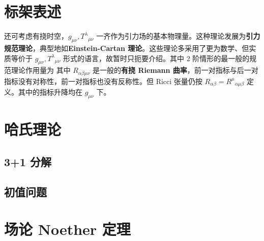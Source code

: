 \section{标架表述}

还可考虑有挠时空，$g_{\mu\nu},T^\lambda{}_{\mu\nu}$ 一齐作为引力场的基本物理量。这种理论发展为\textbf{引力规范理论}，典型地如\textbf{Einstein-Cartan 理论}。这些理论多采用了更为数学、但实质等价于 $g_{\mu\nu},T^\lambda{}_{\mu\nu}$ 形式的语言，故暂时只扼要介绍。其中 2 阶情形的最一般的规范理论作用量为
其中 $R_{\alpha \beta \mu \nu}$ 是一般的\textbf{有挠 Riemann 曲率}，前一对指标与后一对指标没有对称性，前一对指标也没有反称性。但 Ricci 张量仍按 $R_{\alpha \beta}=R^\mu{ }_{\alpha \mu \beta}$ 定义。其中的指标升降均在 $g_{\mu\nu}$ 下。

\section{哈氏理论}
\subsection{3+1 分解}

\subsection{初值问题}

\section{场论 Noether 定理}\label{sec:Noether}

